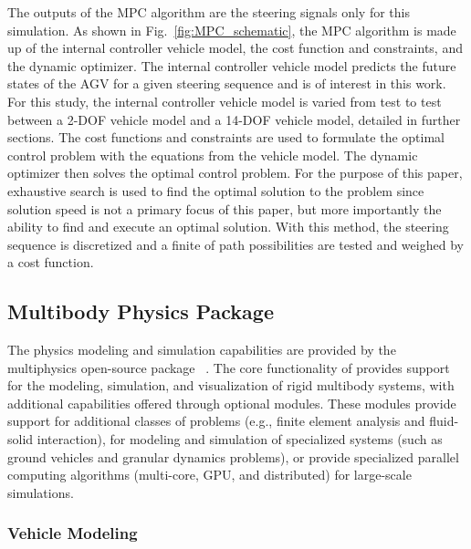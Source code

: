 \documentclass[12pt,twocolumn]{article}
\newcommand{\CHRONO}{{\sffamily{{Chrono}}}}
\begin{document}
The outputs of the MPC algorithm are the steering signals only for this simulation. As shown in Fig.~\ref{fig:MPC_schematic}, the MPC algorithm is made up of the internal controller vehicle model, the cost function and constraints, and the dynamic optimizer. The internal controller vehicle model predicts the future states of the AGV for a given steering sequence and is of interest in this work. For this study, the internal controller vehicle model is varied from test to test between a 2-DOF vehicle model and a 14-DOF vehicle model, detailed in further sections. The cost functions and constraints are used to formulate the optimal control problem with the equations from the vehicle model. The dynamic optimizer then solves the optimal control problem. For the purpose of this paper, exhaustive search is used to find the optimal solution to the problem since solution speed is not a primary focus of this paper, but more importantly the ability to find and execute an optimal solution. With this method, the steering sequence is discretized and a finite of path possibilities are tested and weighed by a cost function. 


\subsection{{\CHRONO} Multibody Physics Package}\label{ss:Chrono}

The physics modeling and simulation capabilities are provided by the multiphysics open-source package {\CHRONO}~\cite{Chrono2016}. The core functionality of {\CHRONO} provides support for the modeling, simulation, and visualization of rigid multibody systems, with additional capabilities offered through optional modules. These modules provide support for additional classes of problems (e.g., finite element analysis and fluid-solid interaction), for modeling and simulation of specialized systems (such as ground vehicles and granular dynamics problems), or provide specialized parallel computing algorithms (multi-core, GPU, and distributed) for large-scale simulations.


\subsubsection{Vehicle Modeling}\label{sss:Chrono_Vehicle}
	
\end{document}
